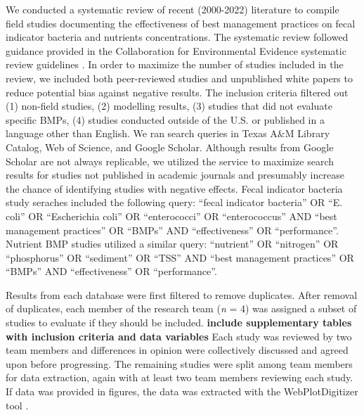 \documentclass[utf8]{FrontiersinHarvard}
\begin{document}
We conducted a systematic review of recent (2000-2022) literature to
compile field studies documenting the effectiveness of best management
practices on fecal indicator bacteria and nutrients concentrations. The
systematic review followed guidance provided in the Collaboration for
Environmental Evidence systematic review guidelines
\citep{collaborationforenvironmentalevidenceGuidelinesStandardsEvidence2018}.
In order to maximize the number of studies included in the review, we
included both peer-reviewed studies and unpublished white papers to
reduce potential bias against negative results. The inclusion criteria
filtered out (1) non-field studies, (2) modelling results, (3) studies
that did not evaluate specific BMPs, (4) studies conducted outside of
the U.S. or published in a language other than English. We ran search
queries in Texas A\&M Library Catalog, Web of Science, and Google
Scholar. Although results from Google Scholar are not always replicable,
we utilized the service to maximize search results for studies not
published in academic journals and presumably increase the chance of
identifying studies with negative effects. Fecal indicator bacteria
study seraches included the following query: ``fecal indicator
bacteria'' OR ``E. coli'' OR ``Escherichia coli'' OR ``enterococci'' OR
``enterococcus'' AND ``best management practices'' OR ``BMPs'' AND
``effectiveness'' OR ``performance''. Nutrient BMP studies utilized a
similar query: ``nutrient'' OR ``nitrogen'' OR ``phosphorus'' OR
``sediment'' OR ``TSS'' AND ``best management practices'' OR ``BMPs''
AND ``effectiveness'' OR ``performance''.

Results from each database were first filtered to remove duplicates.
After removal of duplicates, each member of the research team (\emph{n}
= 4) was assigned a subset of studies to evaluate if they should be
included. \textbf{include supplementary tables with inclusion criteria
and data variables} Each study was reviewed by two team members and
differences in opinion were collectively discussed and agreed upon
before progressing. The remaining studies were split among team members
for data extraction, again with at least two team members reviewing each
study. If data was provided in figures, the data was extracted with the
WebPlotDigitizer tool \citep{rohatgiWebPlotDigitizer2022}.
\end{document}
